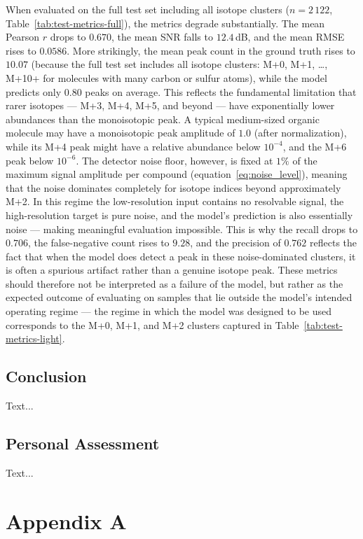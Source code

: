 \documentclass[12pt,a4paper]{report}
\begin{document}
When evaluated on the full test set including all isotope clusters ($n = 2\,122$, Table~\ref{tab:test-metrics-full}), the metrics degrade substantially.  The mean Pearson $r$ drops to $0.670$, the mean SNR falls to $12.4\,$dB, and the mean RMSE rises to $0.0586$.  More strikingly, the mean peak count in the ground truth rises to $10.07$ (because the full test set includes all isotope clusters: M+0, M+1, \ldots, M+10+ for molecules with many carbon or sulfur atoms), while the model predicts only $0.80$ peaks on average.  This reflects the fundamental limitation that rarer isotopes — M+3, M+4, M+5, and beyond — have exponentially lower abundances than the monoisotopic peak.  A typical medium-sized organic molecule may have a monoisotopic peak amplitude of $1.0$ (after normalization), while its M+4 peak might have a relative abundance below $10^{-4}$, and the M+6 peak below $10^{-6}$.  The detector noise floor, however, is fixed at $1\%$ of the maximum signal amplitude per compound (equation~\ref{eq:noise_level}), meaning that the noise dominates completely for isotope indices beyond approximately M+2.  In this regime the low-resolution input contains no resolvable signal, the high-resolution target is pure noise, and the model's prediction is also essentially noise — making meaningful evaluation impossible.  This is why the recall drops to $0.706$, the false-negative count rises to $9.28$, and the precision of $0.762$ reflects the fact that when the model does detect a peak in these noise-dominated clusters, it is often a spurious artifact rather than a genuine isotope peak.  These metrics should therefore not be interpreted as a failure of the model, but rather as the expected outcome of evaluating on samples that lie outside the model's intended operating regime — the regime in which the model was designed to be used corresponds to the M+0, M+1, and M+2 clusters captured in Table~\ref{tab:test-metrics-light}.

\section{Conclusion}
Text...

\section{Personal Assessment}
Text...

\printbibliography

\chapter{Appendix A}
\end{document}
